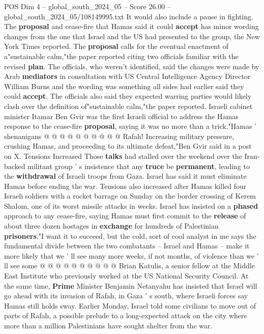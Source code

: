 \begin{textsample}{POS Dim 4 – global\_south\_2024\_05 – Score 26.00 – global\_south\_2024\_05/108149995.txt}
It would also include a pause in fighting.
The \textbf{proposal} and cease-fire that Hamas said it could \textbf{accept} has minor wording changes from the one that Israel and the US had presented to the group, the New York Times reported.
The \textbf{proposal} calls for the eventual enactment of a"sustainable calm,"the paper reported citing two officials familiar with the revised \textbf{plan}.
The officials, who weren't identified, said the changes were made by Arab \textbf{mediators} in consultation with US Central Intelligence Agency Director William Burns and the wording was something all sides had earlier said they could \textbf{accept}.
The officials also said they expected warring parties would likely clash over the definition of"sustainable calm,"the paper reported.
Israeli cabinet minister Itamar Ben Gvir was the first Israeli official to address the Hamas response to the cease-fire \textbf{proposal}, saying it was no more than a trick."Hamas ' shenanigans @ @ @ @ @ @ @ @ @ @ Rafah!
Increasing military pressure, crushing Hamas, and proceeding to its ultimate defeat,"Ben Gvir said in a post on X.
Tensions Increased Those \textbf{talks} had stalled over the weekend over the Iran-backed militant group ' s insistence that any \textbf{truce} be \textbf{permanent}, leading to the \textbf{withdrawal} of Israeli troops from Gaza.
Israel has said it must eliminate Hamas before ending the war.
Tensions also increased after Hamas killed four Israeli soldiers with a rocket barrage on Sunday on the border crossing of Kerem Shalom, one of its worst missile attacks in weeks.
Israel has insisted on a \textbf{phased} approach to any cease-fire, saying Hamas must first commit to the \textbf{release} of about three dozen hostages in \textbf{exchange} for hundreds of Palestinian \textbf{prisoners}."I want it to succeed, but the cold, sort of cool analyst in me says the fundamental divide between the two combatants -- Israel and Hamas -- make it more likely that we ' ll see many more weeks, if not months, of violence than we ' ll see some @ @ @ @ @ @ @ @ @ @ Brian Katulis, a senior fellow at the Middle East Institute who previously worked at the US National Security Council.
At the same time, \textbf{Prime} Minister Benjamin Netanyahu has insisted that Israel will go ahead with its invasion of Rafah, in Gaza ' s south, where Israeli forces say Hamas still holds sway.
Earlier Monday, Israel told some civilians to move out of parts of Rafah, a possible prelude to a long-expected attack on the city where more than a million Palestinians have sought shelter from the war.

\end{textsample}
